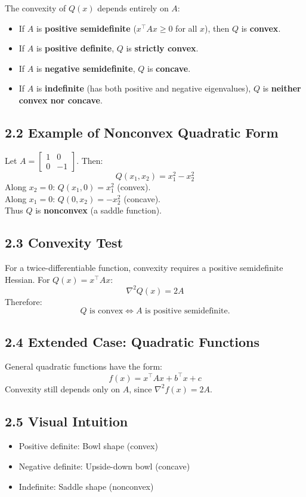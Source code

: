 \documentclass{article}
\begin{document}
The convexity of $Q(x)$ depends entirely on $A$:
\begin{itemize}
    \item If $A$ is \textbf{positive semidefinite} ($x^\top A x \ge 0$ for all $x$), then $Q$ is \textbf{convex}.
    \item If $A$ is \textbf{positive definite}, $Q$ is \textbf{strictly convex}.
    \item If $A$ is \textbf{negative semidefinite}, $Q$ is \textbf{concave}.
    \item If $A$ is \textbf{indefinite} (has both positive and negative eigenvalues), $Q$ is \textbf{neither convex nor concave}.
\end{itemize}

\subsection*{2.2 Example of Nonconvex Quadratic Form}
Let $A = \begin{bmatrix}1 & 0 \\ 0 & -1\end{bmatrix}$. Then:
\[
Q(x_1, x_2) = x_1^2 - x_2^2
\]
Along $x_2 = 0$: $Q(x_1,0) = x_1^2$ (convex). \\
Along $x_1 = 0$: $Q(0, x_2) = -x_2^2$ (concave). \\
Thus $Q$ is \textbf{nonconvex} (a saddle function).

\subsection*{2.3 Convexity Test}
For a twice-differentiable function, convexity requires a positive semidefinite Hessian. For $Q(x) = x^\top A x$:
\[
\nabla^2 Q(x) = 2A
\]
Therefore:
\[
Q \text{ is convex} \iff A \text{ is positive semidefinite}.
\]

\subsection*{2.4 Extended Case: Quadratic Functions}
General quadratic functions have the form:
\[
f(x) = x^\top A x + b^\top x + c
\]
Convexity still depends only on $A$, since $\nabla^2 f(x) = 2A$.

\subsection*{2.5 Visual Intuition}
\begin{itemize}
    \item Positive definite: Bowl shape (convex)
    \item Negative definite: Upside-down bowl (concave)
    \item Indefinite: Saddle shape (nonconvex)
\end{itemize}
\end{document}
